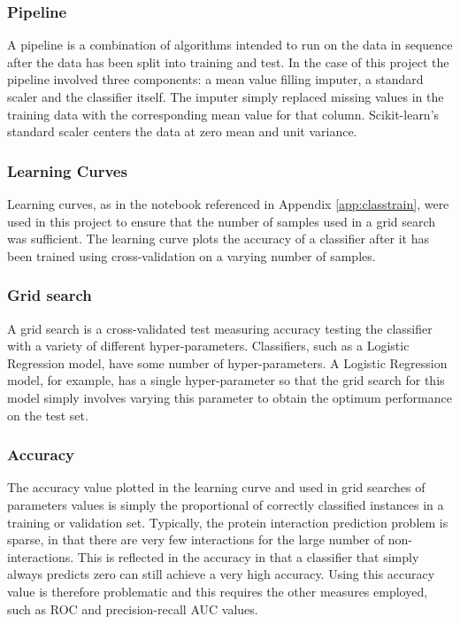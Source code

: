 \subsubsection*{Pipeline}

A pipeline is a combination of algorithms intended to run on the data in sequence after the data has been split into training and test.
In the case of this project the pipeline involved three components: a mean value filling imputer, a standard scaler and the classifier itself.
The imputer simply replaced missing values in the training data with the corresponding mean value for that column.
Scikit-learn's standard scaler centers the data at zero mean and unit variance.


\subsubsection*{Learning Curves}
Learning curves, as in the notebook referenced in Appendix \ref{app:classtrain}, were used in this project to ensure that the number of samples used in a grid search was sufficient.
The learning curve plots the accuracy of a classifier after it has been trained using cross-validation on a varying number of samples.

\subsubsection*{Grid search}
A grid search is a cross-validated test measuring accuracy testing the classifier with a variety of different hyper-parameters.
Classifiers, such as a Logistic Regression model, have some number of hyper-parameters.
A Logistic Regression model, for example, has a single hyper-parameter so that the grid search for this model simply involves varying this parameter to obtain the optimum performance on the test set.

\subsubsection*{Accuracy}
The accuracy value plotted in the learning curve and used in grid searches of parameters values is simply the proportional of correctly classified instances in a training or validation set.
Typically, the protein interaction prediction problem is sparse, in that there are very few interactions for the large number of non-interactions.
This is reflected in the accuracy in that a classifier that simply always predicts zero can still achieve a very high accuracy.
Using this accuracy value is therefore problematic and this requires the other measures employed, such as \ac{ROC} and precision-recall \ac{AUC} values.

